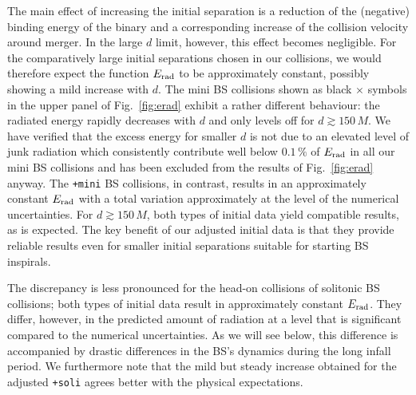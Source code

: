 \documentclass[11pt]{report}  %
\begin{document}
The main effect of increasing the initial separation is a
reduction of the (negative) binding energy of the binary and a corresponding
increase of the collision velocity around merger. In the large
$d$ limit, however, this effect becomes negligible. For the
comparatively large initial separations chosen in our
collisions, we would therefore
expect the function $E_{\rm rad}$ to be approximately constant,
possibly showing a mild increase with $d$. The mini BS collisions
shown as black $\times$ symbols in the upper panel of
Fig.~\ref{fig:erad} exhibit a rather different behaviour:
the radiated energy rapidly decreases with $d$ and only levels
off for $d\gtrsim 150\,M$. We have verified that the excess
energy for smaller $d$ is not due to an elevated level of
junk radiation which consistently contribute well below 
$0.1\,\%$ of $E_{\rm rad}$ in all our mini BS collisions and has
been excluded from the results of Fig.~\ref{fig:erad} anyway.
The {\tt +mini} BS collisions,
in contrast, results in an approximately constant $E_{\rm rad}$
with a total variation approximately at the level of the
numerical uncertainties. For $d\gtrsim 150\,M$, both types of
initial data yield compatible results, as is expected.
The key benefit of our adjusted initial data is that they provide
reliable results even for smaller initial separations suitable
for starting BS inspirals.

The discrepancy is less pronounced for the head-on collisions
of solitonic BS collisions; both types of initial data result
in approximately constant $E_{\rm rad}$. They differ, however,
in the predicted amount of radiation at a level that
is significant compared to
the numerical uncertainties. As we will see below, this difference
is accompanied by drastic differences in the BS's dynamics during the
long infall period. We furthermore note that the mild but
steady increase obtained for the adjusted {\tt +soli} agrees
better with the physical expectations.
\end{document}
